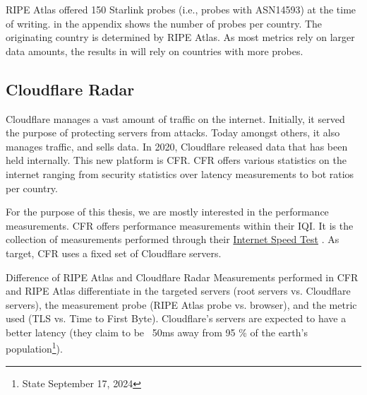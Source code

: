 RIPE Atlas offered 150 Starlink probes (i.e., probes with ASN14593) at the time
of writing.  in the appendix shows the number of
probes per country. The originating country is determined by RIPE Atlas. As
most metrics rely on larger data amounts, the results in 
will rely on countries with more probes.

\subsection{Cloudflare Radar} \label{sec:cloudflare-radar}

Cloudflare manages a vast amount of traffic on the internet. Initially, it
served the purpose of protecting servers from attacks. Today amongst others, it
also manages traffic, and sells data. In 2020, Cloudflare released data that
has been held internally. This new platform is \ac{CFR}. \ac{CFR} offers
various statistics on the internet ranging from security statistics over
latency measurements to bot ratios per country.

For the purpose of this thesis, we are mostly interested in the performance
measurements. \ac{CFR} offers performance measurements within their \ac{IQI}.
It is the collection of measurements performed through their
\href{https://speed.cloudflare.com/}{Internet Speed Test}
\cite{DavidBelson2023, CloudflareRadarDocsIQI}. As target, \ac{CFR} uses a
fixed set of Cloudflare servers.

\begin{takeaway}{Difference of RIPE Atlas and Cloudflare Radar}
	Measurements performed in \ac{CFR} and RIPE Atlas differentiate in the
	targeted servers (root servers vs. Cloudflare servers), the measurement
	probe (RIPE Atlas probe vs. browser), and the metric used (TLS vs. Time
	to First Byte). Cloudflare's servers are expected to have a better
	latency (they claim to be ~50ms away from 95 \% of the earth's
	population\footnote{State September 17, 2024}).
\end{takeaway}

